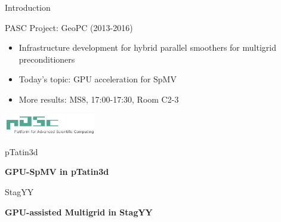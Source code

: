 

\begin{frame}{Introduction}

  \begin{block}{PASC Project: GeoPC (2013-2016)}
  \begin{itemize}
   \item Infrastructure development for hybrid parallel smoothers for multigrid preconditioners
   \item Today's topic: GPU acceleration for SpMV
   \item More results: MS8, 17:00-17:30, Room C2-3
  \end{itemize}
  \end{block}

    \begin{center} \vspace*{2cm}
    \includegraphics[width=0.3\textwidth]{figures/pasc}
  \end{center}

\end{frame}




\begin{frame}{pTatin3d}
   \begin{center} \Large \textbf{GPU-SpMV in pTatin3d} \end{center}
\end{frame}







\begin{frame}{StagYY}
  \begin{center} \Large \textbf{GPU-assisted Multigrid in StagYY} \end{center}
\end{frame}






